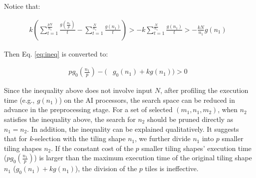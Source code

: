 Notice that:


\begin{equation}
    \begin{aligned}
        k (\sum_{t=1}^{\frac{pN}{n_{1}}}\frac{g(\frac{n_{1}}{p})}{t} - \sum_{t=1}^{\frac{N}{n_{1}}}\frac{g(n_{1})}{t}) > - k \sum_{t=1}^{\frac{N}{n_{1}}}\frac{g(n_{1})}{t} > - \frac{kN}{n_{1}} g(n_{1})
    \end{aligned}
\end{equation}

Then Eq. \ref{eq:ineq} is converted to:


\begin{equation}
    \label{eq:last}
    \begin{aligned}
        pg_{0}(\frac{n_{1}}{p}) - (&g_{0}(n_{1}) + kg(n_{1})) > 0
    \end{aligned}
\end{equation}

Since the inequality above does not involve input $N$, after profiling the execution time (e.g., $g(n_{1})$) on the AI processors, the search space can be reduced in advance in the preprocessing stage. For a set of selected $(m_{1}, n_{1}, m_{2})$, when $n_{2}$ satisfies the inequality above, the search for $n_{2}$ should be pruned directly as $n_{1} = n_{2}$. In addition, the inequality can be explained qualitatively. It suggests that for \textit{k}-selection with the tiling shape $n_{1}$, we further divide $n_{1}$ into $p$ smaller tiling shapes $n_{2}$. If the constant cost of the $p$ smaller tiling shapes' execution time ($pg_{0}(\frac{n_{1}}{p})$) is larger than the maximum execution time of the original tiling shape $n_{1}$ ($g_{0}(n_{1}) + kg(n_{1})$), the division of the $p$ tiles is ineffective.

\begin{figure}[htbp]
\end{figure}

